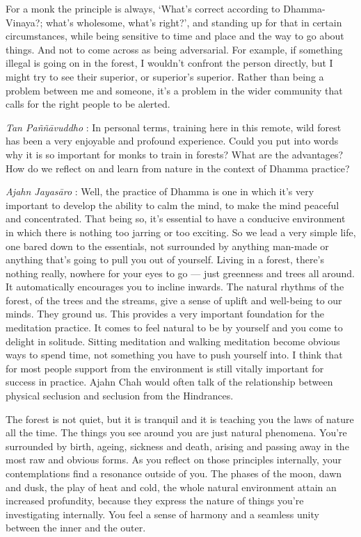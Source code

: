 For a monk the principle is always, `What's correct according to
Dhamma-Vinaya?; what's wholesome, what's right?', and standing up for
that in certain circumstances, while being sensitive to time and place
and the way to go about things. And not to come across as being
adversarial. For example, if something illegal is going on in the
forest, I wouldn't confront the person directly, but I might try to see
their superior, or superior's superior. Rather than being a problem
between me and someone, it's a problem in the wider community that calls
for the right people to be alerted.

\emph{Tan Paññāvuddho} : In personal terms, training here in this
remote, wild forest has been a very enjoyable and profound experience.
Could you put into words why it is so important for monks to train in
forests? What are the advantages? How do we reflect on and learn from
nature in the context of Dhamma practice?

\emph{Ajahn Jayasāro }: Well, the practice of Dhamma is one in which
it's very important to develop the ability to calm the mind, to make the
mind peaceful and concentrated. That being so, it's essential to have a
conducive environment in which there is nothing too jarring or too
exciting. So we lead a very simple life, one bared down to the
essentials, not surrounded by anything man-made or anything that's going
to pull you out of yourself. Living in a forest, there's nothing really,
nowhere for your eyes to go --- just greenness and trees all around. It
automatically encourages you to incline inwards. The natural rhythms of
the forest, of the trees and the streams, give a sense of uplift and
well-being to our minds. They ground us. This provides a very important
foundation for the meditation practice. It comes to feel natural to be
by yourself and you come to delight in solitude. Sitting meditation and
walking meditation become obvious ways to spend time, not something you
have to push yourself into. I think that for most people support from
the environment is still vitally important for success in practice.
Ajahn Chah would often talk of the relationship between physical
seclusion and seclusion from the Hindrances.

The forest is not quiet, but it is tranquil and it is teaching you the
laws of nature all the time. The things you see around you are just
natural phenomena. You're surrounded by birth, ageing, sickness and
death, arising and passing away in the most raw and obvious forms. As
you reflect on those principles internally, your contemplations find a
resonance outside of you. The phases of the moon, dawn and dusk, the
play of heat and cold, the whole natural environment attain an increased
profundity, because they express the nature of things you're
investigating internally. You feel a sense of harmony and a seamless
unity between the inner and the outer.

